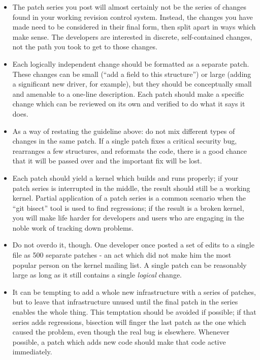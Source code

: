 \documentclass[a4paper,8pt,english]{sphinxmanual}
\begin{document}
\begin{itemize}
\item {} 
The patch series you post will almost certainly not be the series of
changes found in your working revision control system.  Instead, the
changes you have made need to be considered in their final form, then
split apart in ways which make sense.  The developers are interested in
discrete, self-contained changes, not the path you took to get to those
changes.

\item {} 
Each logically independent change should be formatted as a separate
patch.  These changes can be small (``add a field to this structure'') or
large (adding a significant new driver, for example), but they should be
conceptually small and amenable to a one-line description.  Each patch
should make a specific change which can be reviewed on its own and
verified to do what it says it does.

\item {} 
As a way of restating the guideline above: do not mix different types of
changes in the same patch.  If a single patch fixes a critical security
bug, rearranges a few structures, and reformats the code, there is a
good chance that it will be passed over and the important fix will be
lost.

\item {} 
Each patch should yield a kernel which builds and runs properly; if your
patch series is interrupted in the middle, the result should still be a
working kernel.  Partial application of a patch series is a common
scenario when the ``git bisect'' tool is used to find regressions; if the
result is a broken kernel, you will make life harder for developers and
users who are engaging in the noble work of tracking down problems.

\item {} 
Do not overdo it, though.  One developer once posted a set of edits
to a single file as 500 separate patches - an act which did not make him
the most popular person on the kernel mailing list.  A single patch can
be reasonably large as long as it still contains a single \emph{logical}
change.

\item {} 
It can be tempting to add a whole new infrastructure with a series of
patches, but to leave that infrastructure unused until the final patch
in the series enables the whole thing.  This temptation should be
avoided if possible; if that series adds regressions, bisection will
finger the last patch as the one which caused the problem, even though
the real bug is elsewhere.  Whenever possible, a patch which adds new
code should make that code active immediately.

\end{itemize}
\end{document}
